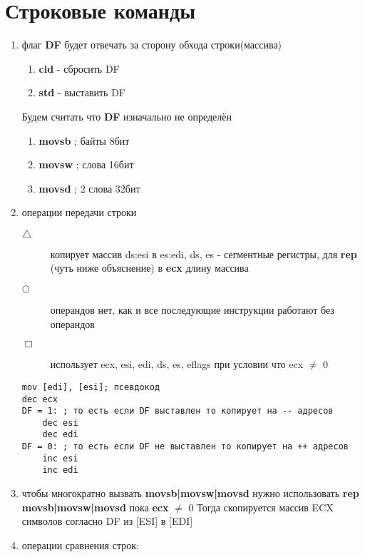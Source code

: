 \documentclass[a4paper, 12pt]{article}
\begin{document}
    \section*{Строковые команды}
    \hypertarget{strings_op}{}
    \begin{enumerate}
        \item флаг \textbf{DF} будет отвечать за сторону обхода строки(массива)
        \begin{enumerate}
            \item \textbf{cld} - сбросить DF
            \item \textbf{std} - выставить DF
        \end{enumerate}
        Будем считать что \textbf{DF} изначально не определён
        \begin{enumerate}
            \item \textbf{movsb} ; байты 8бит
            \item \textbf{movsw} ; слова 16бит
            \item \textbf{movsd} ; 2 слова 32бит
        \end{enumerate} 
        \item операции передачи строки
        \begin{description}
            \item[$\triangle$] копирует массив ds:esi в es:edi,  ds, es - сегментные регистры, для \textbf{rep} (чуть ниже объяснение) в \textbf{ecx} длину массива
            \item[$\bigcirc$] операндов нет, как и все последующие инструкции работают без операндов
            \item[$\Box$] использует ecx, esi, edi, ds, es, eflags при условии что ecx $\ne$ 0
        \end{description}
        \begin{lstlisting}
mov [edi], [esi]; псевдокод
dec ecx
DF = 1: ; то есть если DF выставлен то копирует на -- адресов
    dec esi
    dec edi
DF = 0: ; то есть если DF не выставлен то копирует на ++ адресов
    inc esi
    inc edi
        \end{lstlisting}
        \item чтобы многократно вызвать \textbf{movsb|movsw|movsd} нужно использовать \textbf{rep movsb|movsw|movsd} пока \textbf{ecx} $\ne$ 0
        Тогда скопируется массив ECX символов согласно DF из [ESI] в [EDI]
        \item операции сравнения строк:
        \begin{enumerate}

\end{enumerate}
\end{enumerate}
\end{document}
